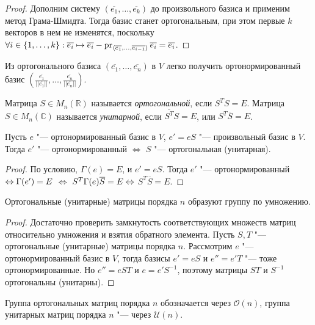 \begin{proof}
	Дополним систему $(\overline{e_1}, \dots, \overline{e_k})$ до произвольного базиса и применим метод Грама-Шмидта. Тогда базис станет ортогональным, при этом первые $k$ векторов в нем не изменятся, поскольку $\forall i \hm{\in} \{1, \dots, k\}: \overline{e_i} \hm{\mapsto} \overline{e_i} - \pr_{\langle\overline{e_1}, \dots, \overline{e_{i - 1}}\rangle}{\overline{e_i}} = \overline{e_i}$.
\end{proof}

\begin{note}
	Из ортогонального базиса $(\overline{e_1}, \dots, \overline{e_n})$ в $V$ легко получить ортонормированный базис $(\frac{\overline{e_1}}{||\overline{e_1}||}, \dots, \frac{\overline{e_n}}{||\overline{e_n}||})$.
\end{note}

\begin{definition}
	Матрица $S \in M_n(\mathbb{R})$ называется \textit{ортогональной}, если $S^TS = E$. Матрица $S \in M_n(\mathbb{C})$ называется \textit{унитарной}, если $\overline{S^T}S = E$, или $S^T\overline{S} = E$.
\end{definition}

\begin{theorem}
	Пусть $e$ "--- ортонормированный базис в $V$, $e' = eS$ "--- произвольный базис в $V$. Тогда $e'$ "--- ортонормированный $\Leftrightarrow$ $S$ "--- ортогональная (унитарная).
\end{theorem}

\begin{proof}
	По условию, $\Gamma(e) = E$, и $e' = eS$. Тогда $e'$ "--- ортонормированный $\hm\Leftrightarrow \Gamma(e') = E$ $\Leftrightarrow$ $S^T\Gamma(e)\overline{S} \hm{=} E \hm{\Leftrightarrow}$ $S^T\overline{S} = E$.
\end{proof}

\begin{proposition}
	Ортогональные (унитарные) матрицы порядка $n$ образуют группу по умножению.
\end{proposition}

\begin{proof}
	Достаточно проверить замкнутость соответствующих множеств матриц относительно умножения и взятия обратного элемента. Пусть $S, T$ "--- ортогональные (унитарные) матрицы порядка $n$. Рассмотрим $e$ "--- ортонормированный базис в $V$, тогда базисы $e' = eS$ и $e'' = e'T$ "--- тоже ортонормированные. Но $e'' = eST$ и $e = e'S^{-1}$, поэтому матрицы $ST$ и $S^{-1}$ ортогональны (унитарны).
\end{proof}

\begin{definition}
	Группа ортогональных матриц порядка $n$ обозначается через $\mathcal{O}(n)$, группа унитарных матриц порядка $n$ "--- через $\mathcal{U}(n)$.
\end{definition}